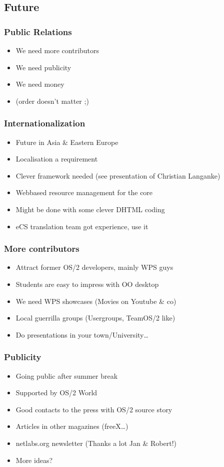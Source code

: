\documentclass{beamer}
\begin{document}
\subsection{Future}
\begin{frame}
\frametitle{Public Relations}
\begin{itemize}[<+->]
  \item We need more contributors
  \item We need publicity
  \item We need money
  \item (order doesn't matter ;)
\end{itemize}
\end{frame}

\begin{frame}
\frametitle{Internationalization}
\begin{itemize}[<+->]
  \item Future in Asia \& Eastern Europe
  \item Localisation a requirement
  \item Clever framework needed (see presentation of Christian Langanke)
  \item Webbased resource management for the core
  \item Might be done with some clever DHTML coding
  \item eCS translation team got experience, use it
\end{itemize}
\end{frame}

\begin{frame}
\frametitle{More contributors}
\begin{itemize}[<+->]
  \item Attract former OS/2 developers, mainly WPS guys
  \item Students are easy to impress with OO desktop
  \item We need WPS showcases (Movies on Youtube \& co)
  \item Local guerrilla groups (Usergroups, TeamOS/2 like)
  \item Do presentations in your town/University\ldots
\end{itemize}
\end{frame}

\begin{frame}
\frametitle{Publicity}
\begin{itemize}[<+->]
  \item Going public after summer break
  \item Supported by OS/2 World
  \item Good contacts to the press with OS/2 source story
  \item Articles in other magazines (freeX\ldots)
  \item netlabs.org newsletter (Thanks a lot Jan \& Robert!)
  \item More ideas?
\end{itemize}
\end{frame}
\end{document}
